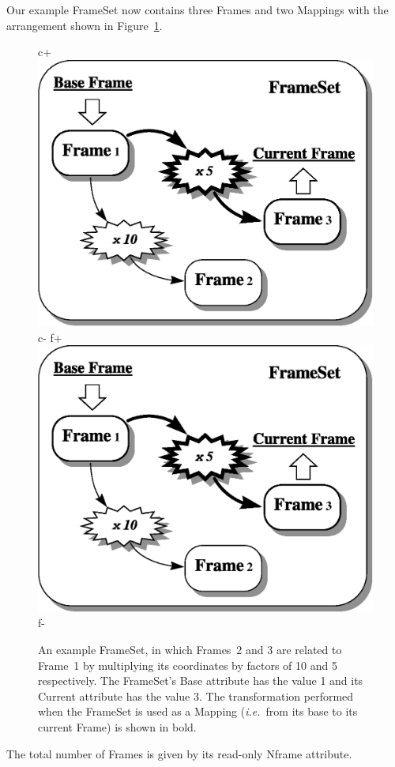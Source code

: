 \documentclass[twoside,11pt]{article}
\newenvironment{latexonly}{}{}
\begin{document}
\begin{latexonly}
   Our example FrameSet now contains three Frames and two Mappings with
   the arrangement shown in Figure~\ref{fig:fsexample}.
   \begin{figure}
   \begin{center}
c+
   \includegraphics[scale=0.6]{sun211_figures/fsexample.eps}
c-
f+
   \includegraphics[scale=0.6]{sun210_figures/fsexample.eps}
f-
   \caption{An example FrameSet, in which Frames~2 and 3 are related to
   Frame~1 by multiplying its coordinates by factors of 10 and 5
   respectively. The FrameSet's Base attribute has the value 1 and its
   Current attribute has the value 3. The transformation performed when
   the FrameSet is used as a Mapping ({\em{i.e.}}\ from its base to
   its current Frame) is shown in bold.}
   \label{fig:fsexample}
   \end{center}
   \end{figure}
   The total number of Frames is given by its read-only Nframe attribute.
\end{latexonly}
\end{document}
